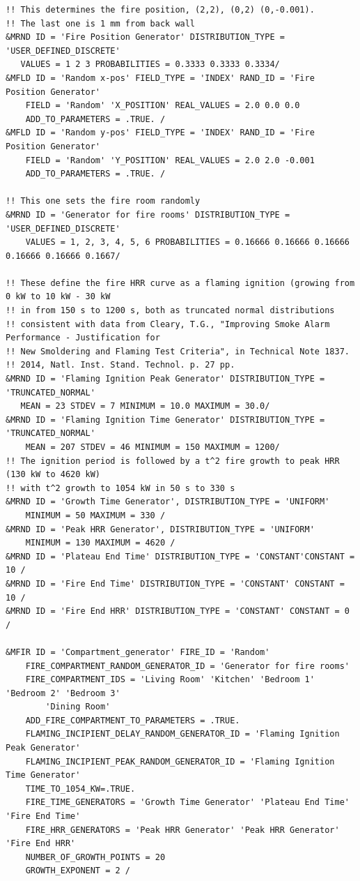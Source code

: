 \documentclass[12pt,twoside]{book}
\begin{document}
\begin{lstlisting}[language=cdata, basicstyle=\scriptsize]
!! This determines the fire position, (2,2), (0,2) (0,-0.001).
!! The last one is 1 mm from back wall
&MRND ID = 'Fire Position Generator' DISTRIBUTION_TYPE = 'USER_DEFINED_DISCRETE'
   VALUES = 1 2 3 PROBABILITIES = 0.3333 0.3333 0.3334/
&MFLD ID = 'Random x-pos' FIELD_TYPE = 'INDEX' RAND_ID = 'Fire Position Generator'
    FIELD = 'Random' 'X_POSITION' REAL_VALUES = 2.0 0.0 0.0
    ADD_TO_PARAMETERS = .TRUE. /
&MFLD ID = 'Random y-pos' FIELD_TYPE = 'INDEX' RAND_ID = 'Fire Position Generator'
    FIELD = 'Random' 'Y_POSITION' REAL_VALUES = 2.0 2.0 -0.001
    ADD_TO_PARAMETERS = .TRUE. /

!! This one sets the fire room randomly
&MRND ID = 'Generator for fire rooms' DISTRIBUTION_TYPE = 'USER_DEFINED_DISCRETE'
    VALUES = 1, 2, 3, 4, 5, 6 PROBABILITIES = 0.16666 0.16666 0.16666 0.16666 0.16666 0.1667/
	
!! These define the fire HRR curve as a flaming ignition (growing from 0 kW to 10 kW - 30 kW
!! in from 150 s to 1200 s, both as truncated normal distributions
!! consistent with data from Cleary, T.G., "Improving Smoke Alarm Performance - Justification for
!! New Smoldering and Flaming Test Criteria", in Technical Note 1837.
!! 2014, Natl. Inst. Stand. Technol. p. 27 pp.
&MRND ID = 'Flaming Ignition Peak Generator' DISTRIBUTION_TYPE = 'TRUNCATED_NORMAL'
   MEAN = 23 STDEV = 7 MINIMUM = 10.0 MAXIMUM = 30.0/
&MRND ID = 'Flaming Ignition Time Generator' DISTRIBUTION_TYPE = 'TRUNCATED_NORMAL'
    MEAN = 207 STDEV = 46 MINIMUM = 150 MAXIMUM = 1200/
!! The ignition period is followed by a t^2 fire growth to peak HRR (130 kW to 4620 kW)
!! with t^2 growth to 1054 kW in 50 s to 330 s
&MRND ID = 'Growth Time Generator', DISTRIBUTION_TYPE = 'UNIFORM'
    MINIMUM = 50 MAXIMUM = 330 /
&MRND ID = 'Peak HRR Generator', DISTRIBUTION_TYPE = 'UNIFORM'
    MINIMUM = 130 MAXIMUM = 4620 /
&MRND ID = 'Plateau End Time' DISTRIBUTION_TYPE = 'CONSTANT'CONSTANT = 10 /
&MRND ID = 'Fire End Time' DISTRIBUTION_TYPE = 'CONSTANT' CONSTANT = 10 /
&MRND ID = 'Fire End HRR' DISTRIBUTION_TYPE = 'CONSTANT' CONSTANT = 0 /

&MFIR ID = 'Compartment_generator' FIRE_ID = 'Random'
    FIRE_COMPARTMENT_RANDOM_GENERATOR_ID = 'Generator for fire rooms'
    FIRE_COMPARTMENT_IDS = 'Living Room' 'Kitchen' 'Bedroom 1' 'Bedroom 2' 'Bedroom 3'
        'Dining Room'
    ADD_FIRE_COMPARTMENT_TO_PARAMETERS = .TRUE.
    FLAMING_INCIPIENT_DELAY_RANDOM_GENERATOR_ID = 'Flaming Ignition Peak Generator'
    FLAMING_INCIPIENT_PEAK_RANDOM_GENERATOR_ID = 'Flaming Ignition Time Generator'
	TIME_TO_1054_KW=.TRUE.
    FIRE_TIME_GENERATORS = 'Growth Time Generator' 'Plateau End Time' 'Fire End Time'
    FIRE_HRR_GENERATORS = 'Peak HRR Generator' 'Peak HRR Generator' 'Fire End HRR'
    NUMBER_OF_GROWTH_POINTS = 20
    GROWTH_EXPONENT = 2 /
\end{lstlisting}
\end{document}
